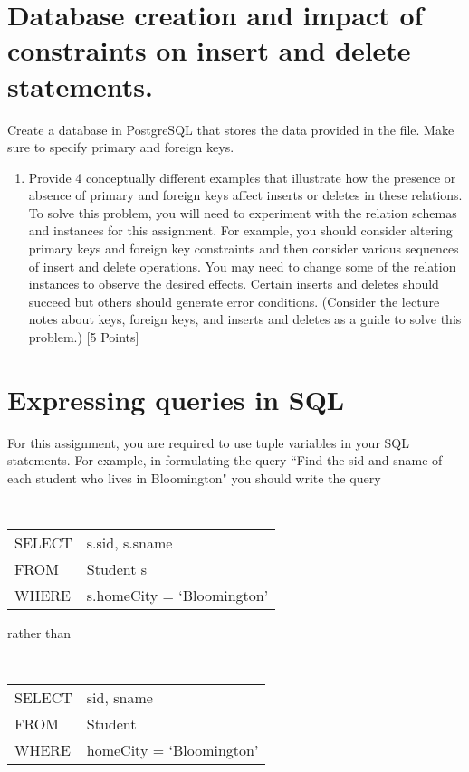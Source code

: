 \documentclass{article}
\newcommand{\blue}[1]{{\color{blue}#1}}
\newtheorem{remark}{Remark}
\begin{document}
\newpage
\section{Database creation and impact of constraints on insert and delete statements.}

Create a database in PostgreSQL that stores the data provided in the \blue{{\tt schema.sql}}
file.
Make sure to specify primary and foreign keys.

\begin{enumerate}
\item Provide 4 conceptually different examples that illustrate how the presence or absence of primary and foreign keys affect inserts or deletes in these relations. To solve this problem, you will need to experiment with the relation schemas and instances for this assignment. For example, you should consider altering primary keys and foreign key constraints and then consider various sequences of insert and delete operations. You may need to change some of the relation instances to observe the desired effects. Certain inserts and deletes should succeed but others should generate error conditions. (Consider the lecture notes about keys, foreign keys, and inserts and deletes as a guide to solve this problem.) [5 Points]
  
  \end{enumerate}
 \newpage
  \section{Expressing queries in SQL }\label{SQLQueries}

For this assignment,  you are required to use  tuple variables in your SQL statements.    
For example, in formulating the query ``Find the sid and sname of each student who lives in Bloomington" you should write the query

\begin{center}{\tt
\begin{tabular}{ll}
SELECT &s.sid, s.sname\\
FROM & Student s\\
WHERE & s.homeCity = `Bloomington'
\end{tabular}}
\end{center}
rather than
\begin{center}{\tt
\begin{tabular}{ll}
SELECT &sid, sname\\
FROM & Student\\
WHERE & homeCity = `Bloomington' 
\end{tabular}}
\end{center}
\end{document}
